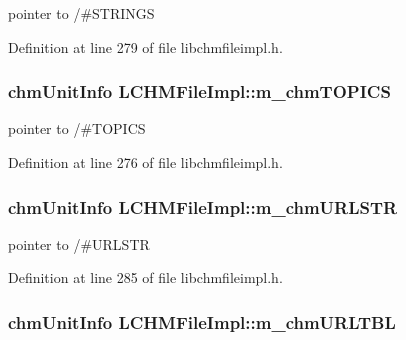 pointer to /\#\+S\+T\+R\+I\+N\+G\+S 



Definition at line 279 of file libchmfileimpl.\+h.

\hypertarget{classLCHMFileImpl_ae4a2d92d948b4482781b6b539ff1dd75}{
\subsubsection[{m\+\_\+chm\+T\+O\+P\+I\+C\+S}]{\setlength{\rightskip}{0pt plus 5cm}chm\+Unit\+Info L\+C\+H\+M\+File\+Impl\+::m\+\_\+chm\+T\+O\+P\+I\+C\+S}}\label{classLCHMFileImpl_ae4a2d92d948b4482781b6b539ff1dd75}


pointer to /\#\+T\+O\+P\+I\+C\+S 



Definition at line 276 of file libchmfileimpl.\+h.

\hypertarget{classLCHMFileImpl_a8b003f45596e247595b90b57b1e8c499}{
\subsubsection[{m\+\_\+chm\+U\+R\+L\+S\+T\+R}]{\setlength{\rightskip}{0pt plus 5cm}chm\+Unit\+Info L\+C\+H\+M\+File\+Impl\+::m\+\_\+chm\+U\+R\+L\+S\+T\+R}}\label{classLCHMFileImpl_a8b003f45596e247595b90b57b1e8c499}


pointer to /\#\+U\+R\+L\+S\+T\+R 



Definition at line 285 of file libchmfileimpl.\+h.

\hypertarget{classLCHMFileImpl_a6570c3bf72f4ed7ee5992005a88320c9}{
\subsubsection[{m\+\_\+chm\+U\+R\+L\+T\+B\+L}]{\setlength{\rightskip}{0pt plus 5cm}chm\+Unit\+Info L\+C\+H\+M\+File\+Impl\+::m\+\_\+chm\+U\+R\+L\+T\+B\+L}}\label{classLCHMFileImpl_a6570c3bf72f4ed7ee5992005a88320c9}


